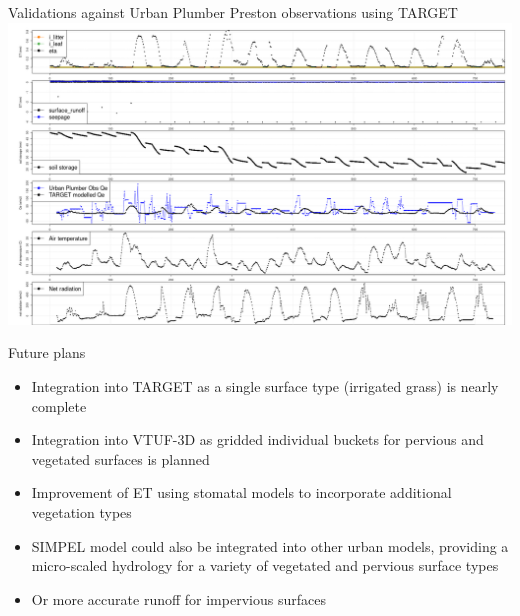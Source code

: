 \documentclass{beamer}
\begin{document}
\begin{frame}{Validations against Urban Plumber Preston observations using TARGET} 
\includegraphics[scale=0.20]{PrestonFeb2004_4mmIrr_ground.png}
\end{frame}


\begin{frame}{Future plans} 

\begin{itemize}

\item Integration into TARGET as a single surface type (irrigated grass) is nearly complete

\item Integration into VTUF-3D as gridded individual buckets for pervious and vegetated surfaces is planned

\item Improvement of ET using stomatal models to incorporate additional vegetation types

\item SIMPEL model could also be integrated into other urban models, providing a micro-scaled hydrology for a variety of vegetated and pervious surface types

\item Or more accurate runoff for impervious surfaces

\end{itemize}


\end{frame}



%
%
\end{document}
